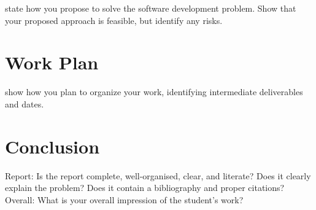 \documentclass{mprop}
\begin{document}
state how you propose to solve the software development problem. Show that your proposed approach is feasible, but identify any risks.

\section{Work Plan}

show how you plan to organize your work, identifying intermediate deliverables and dates.

\section{Conclusion}

Report: Is the report complete, well-organised, clear, and literate? Does it clearly explain the problem? Does it contain a bibliography and proper citations?
Overall: What is your overall impression of the student’s work?



\end{document}
